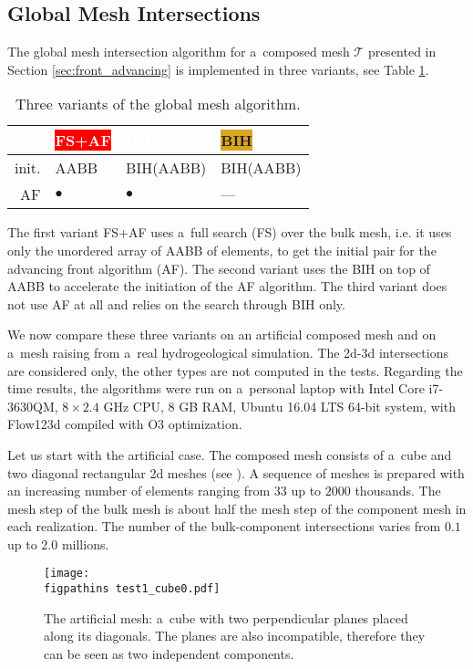 \subsection{Global Mesh Intersections}
The global mesh intersection algorithm for a~composed mesh $\mathcal T$ presented in Section \ref{sec:front_advancing} is
implemented in three variants, see Table \ref{tab:search_algorithms}.
\begin{table}[!htb]
\begin{center}
\bgroup
\def\arraystretch{1.2}
\setlength\tabcolsep{5pt}
\begin{tabular}{r
                >{\centering\arraybackslash}p{20ex}
                >{\centering\arraybackslash}p{20ex}
                >{\centering\arraybackslash}p{20ex}}
    \toprule
    &   \colorbox{red}{\textcolor{white}{\textbf{FS+AF\vphantom{By}}}} &
        \colorbox{NavyBlue}{\textcolor{white}{\textbf{BIH+AF\vphantom{By}}}} & 
        \colorbox{Goldenrod}{\textbf{BIH\vphantom{By}}} \\ \midrule
    init. & AABB & BIH(AABB) & BIH(AABB) \\
    AF   & $\bullet$ & $\bullet$ & --- \\
    \bottomrule
\end{tabular}
\caption{Three variants of the global mesh algorithm.}
\label{tab:search_algorithms}
\egroup
\end{center}
\end{table}
The first variant FS+AF uses a~full search (FS) over the bulk mesh, i.e. it uses only the unordered array of AABB of elements,
to get the initial pair for the advancing front algorithm (AF).
The second variant uses the BIH on top of AABB to accelerate the initiation of the AF algorithm.
The third variant does not use AF at all and relies on the search through BIH only. 

We now compare these three variants on an artificial composed mesh and on a~mesh raising from a~real hydrogeological simulation.
The 2d-3d intersections are considered only, the other types are not computed in the tests.
Regarding the time results, the algorithms were run on a~personal laptop with Intel Core i7-3630QM, $8\times 2.4$ GHz CPU, 8 GB RAM,
Ubuntu 16.04 LTS 64-bit system, with Flow123d compiled with O3 optimization.

Let us start with the artificial case. The composed mesh consists of a~cube and two diagonal rectangular 2d meshes (see ).
A sequence of meshes is prepared with an increasing number of elements ranging
from $33$ up to $2000$ thousands. The mesh step of the bulk mesh is about half the mesh step of the component mesh in each realization. 
The number of the bulk-component intersections varies from $0.1$ up to $2.0$ millions.
%
\begin{figure}[!htb]
    \centering
    \texttt{[image: \\figpathins test1\_cube0.pdf]}
    \caption[Artificial mesh -- cube.]
    {The artificial mesh: a~cube with two perpendicular planes placed along its diagonals.
        The planes are also incompatible, therefore they can be seen as two independent components.}
    \label{fig:cube_mesh}
\end{figure}

